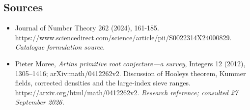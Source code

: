 \documentclass[11pt,a4paper]{article}
\numberwithin{equation}{section}
\begin{document}
\subsection{Sources}
\begin{itemize}\raggedright
\item[\textnormal{[S1]}]\hypertarget{source:1183:1}{} Journal of Number Theory 262 (2024), 161-185.
\url{https://www.sciencedirect.com/science/article/pii/S0022314X24000829}.
{\small\textit{Catalogue formulation source.}}
\item[\textnormal{[E1]}]\hypertarget{extra:1183:1}{} Pieter Moree, \emph{Artin\textquotesingle s primitive root conjecture---a survey}, Integers 12 (2012), 1305--1416; arXiv:math/0412262v2. Discussion of Hooley\textquotesingle s theorem, Kummer fields, corrected densities and the large-index sieve ranges.
\url{https://arxiv.org/html/math/0412262v2}.
{\small\textit{Research reference; consulted 27 September 2026.}}
\end{itemize}
\end{document}

